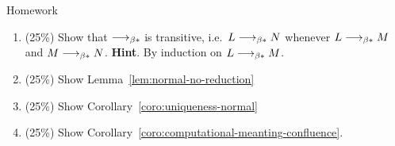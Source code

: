 \begin{frame}{Homework}
  \begin{enumerate}
    \item (25\%) Show that $\longrightarrow_{\beta*}$ is transitive, i.e.\
      $L \longrightarrow_{\beta*} N$ whenever $L \longrightarrow_{\beta*} M$ and $M \longrightarrow_{\beta*} N$. 
      \textbf{Hint}. By induction on $L \longrightarrow_{\beta*} M$.
    \item (25\%) Show Lemma~\ref{lem:normal-no-reduction}
    \item (25\%) Show Corollary~\ref{coro:uniqueness-normal}
    \item (25\%) Show Corollary~\ref{coro:computational-meanting-confluence}.
  \end{enumerate}
\end{frame}
%
%


%  
%   


